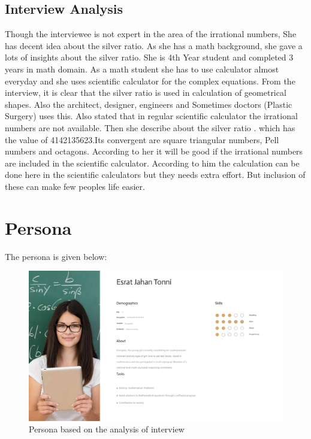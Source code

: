 \documentclass{article}
\begin{document}
\subsection{Interview  Analysis}
Though the interviewee is not expert in the area of the irrational numbers, She has decent idea about the silver ratio. As she has a math background, she gave a lots of insights about the silver ratio. She is 4th Year student and completed 3 years in math domain. As a math student she has to use calculator almost everyday and she uses scientific calculator for the complex equations. From the interview, it is clear that the silver ratio is used in calculation of geometrical shapes. Also the architect, designer, engineers and Sometimes doctors (Plastic Surgery) uses this. Also stated that in regular scientific calculator the irrational numbers are not available. Then she describe about the silver ratio . which has the value of 4142135623.Its convergent are square triangular numbers, Pell numbers and octagons. According to her it will be good if the irrational numbers are included in the scientific calculator. According to him the calculation can be done here in the scientific calculators but they needs extra effort. But inclusion of these can make few peoples life easier. 

\section{Persona}
The persona is given below: 
\begin{figure}[htb!]
  
  \includegraphics[width=1\textwidth]{persona}
  \centering
  \caption{Persona based on the analysis of interview}
\end{figure}
\end{document}
